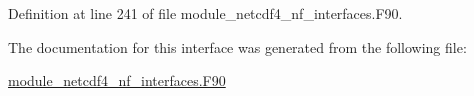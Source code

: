 Definition at line 241 of file module\+\_\+netcdf4\+\_\+nf\+\_\+interfaces.\+F90.



The documentation for this interface was generated from the following file\+:\begin{DoxyCompactItemize}
\item 
\hyperlink{module__netcdf4__nf__interfaces_8F90}{module\+\_\+netcdf4\+\_\+nf\+\_\+interfaces.\+F90}\end{DoxyCompactItemize}

